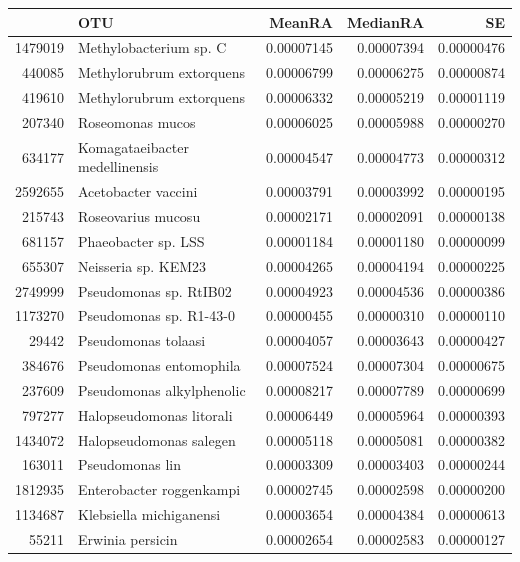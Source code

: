 \begin{table}[ht]
\centering
\begin{tabular}{rlrrr}
  \hline
 & OTU & MeanRA & MedianRA & SE \\ 
  \hline
1479019 & Methylobacterium sp. C & 0.00007145 & 0.00007394 & 0.00000476 \\ 
  440085 & Methylorubrum extorquens & 0.00006799 & 0.00006275 & 0.00000874 \\ 
  419610 & Methylorubrum extorquens & 0.00006332 & 0.00005219 & 0.00001119 \\ 
  207340 & Roseomonas mucos & 0.00006025 & 0.00005988 & 0.00000270 \\ 
  634177 & Komagataeibacter medellinensis & 0.00004547 & 0.00004773 & 0.00000312 \\ 
  2592655 & Acetobacter vaccini & 0.00003791 & 0.00003992 & 0.00000195 \\ 
  215743 & Roseovarius mucosu & 0.00002171 & 0.00002091 & 0.00000138 \\ 
  681157 & Phaeobacter sp. LSS & 0.00001184 & 0.00001180 & 0.00000099 \\ 
  655307 & Neisseria sp. KEM23 & 0.00004265 & 0.00004194 & 0.00000225 \\ 
  2749999 & Pseudomonas sp. RtIB02 & 0.00004923 & 0.00004536 & 0.00000386 \\ 
  1173270 & Pseudomonas sp. R1-43-0 & 0.00000455 & 0.00000310 & 0.00000110 \\ 
  29442 & Pseudomonas tolaasi & 0.00004057 & 0.00003643 & 0.00000427 \\ 
  384676 & Pseudomonas entomophila & 0.00007524 & 0.00007304 & 0.00000675 \\ 
  237609 & Pseudomonas alkylphenolic & 0.00008217 & 0.00007789 & 0.00000699 \\ 
  797277 & Halopseudomonas litorali & 0.00006449 & 0.00005964 & 0.00000393 \\ 
  1434072 & Halopseudomonas salegen & 0.00005118 & 0.00005081 & 0.00000382 \\ 
  163011 & Pseudomonas lin & 0.00003309 & 0.00003403 & 0.00000244 \\ 
  1812935 & Enterobacter roggenkampi & 0.00002745 & 0.00002598 & 0.00000200 \\ 
  1134687 & Klebsiella michiganensi & 0.00003654 & 0.00004384 & 0.00000613 \\ 
  55211 & Erwinia persicin & 0.00002654 & 0.00002583 & 0.00000127 \\ 

\end{tabular}
\end{table}
